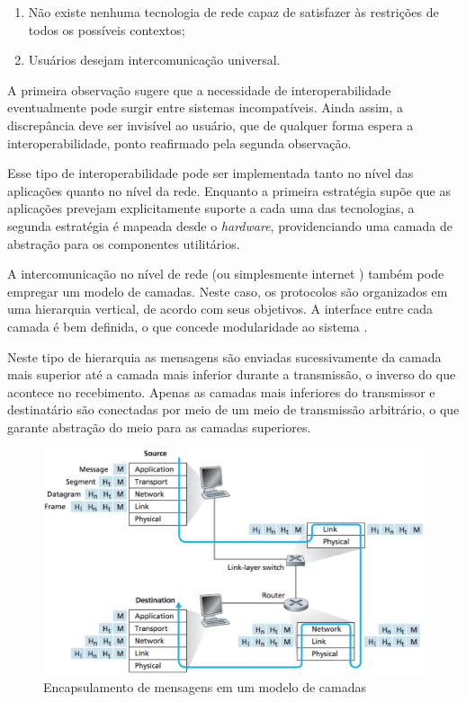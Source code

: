 \begin{enumerate}
  \item{Não existe nenhuma tecnologia de rede capaz de satisfazer às restrições de
        todos os possíveis contextos;}
  \item{Usuários desejam intercomunicação universal.}
\end{enumerate}

A primeira observação sugere que a necessidade de interoperabilidade eventualmente
pode surgir entre sistemas incompatíveis. Ainda assim, a discrepância deve ser
invisível ao usuário, que de qualquer forma espera a interoperabilidade, ponto
reafirmado pela segunda observação.

Esse tipo de interoperabilidade pode ser implementada tanto no nível das aplicações
quanto no nível da rede. Enquanto a primeira estratégia supõe que as aplicações
prevejam explicitamente suporte a cada uma das tecnologias, a segunda estratégia
é mapeada desde o \textit{hardware}, providenciando uma camada de abstração para os
componentes utilitários.

A intercomunicação no nível de rede (ou simplesmente internet \cite{comer2000})
também pode empregar um modelo de camadas. Neste caso, os protocolos são organizados
em uma hierarquia vertical, de acordo com seus objetivos. A interface entre cada
camada é bem definida, o que concede modularidade ao sistema \cite{kurose2012}.

Neste tipo de hierarquia as mensagens são enviadas sucessivamente da camada mais
superior até a camada mais inferior durante a transmissão, o inverso do que acontece
no recebimento. Apenas as camadas mais inferiores do transmissor e destinatário são
conectadas por meio de um meio de transmissão arbitrário, o que garante abstração do
meio para as camadas superiores.

\begin{figure}[h]
	\centering
		\includegraphics[keepaspectratio=true,scale=0.6]{figuras/encapsulamento.eps}
	\caption{Encapsulamento de mensagens em um modelo de camadas \cite{kurose2012}}
	\label{fig:encapsulamento}
\end{figure}

